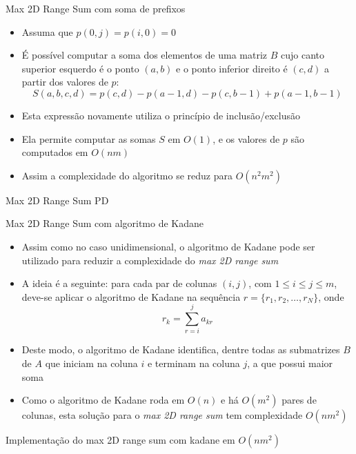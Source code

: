 \begin{frame}[fragile]{Max 2D Range Sum com soma de prefixos}

    \begin{itemize}
        \item Assuma que $p(0, j) = p(i, 0) = 0$

        \item É possível computar a soma dos elementos de uma matriz $B$ cujo canto superior
            esquerdo é o ponto $(a, b)$ e o ponto inferior direito é $(c, d)$ a partir dos
            valores de $p$:
        \[
            S(a, b, c, d) = p(c, d) - p(a - 1, d) - p(c, b - 1) + p(a - 1, b - 1)
        \]

        \item Esta expressão novamente utiliza o princípio de inclusão/exclusão

        \item Ela permite computar as somas $S$ em $O(1)$, e os valores de $p$ são computados em
            $O(nm)$

        \item Assim a complexidade do algoritmo se reduz para $O(n^2m^2)$

    \end{itemize}

\end{frame}



\begin{frame}[fragile]{Max 2D Range Sum PD}
\end{frame}

\begin{frame}[fragile]{Max 2D Range Sum com algoritmo de Kadane}

    \begin{itemize}
        \item Assim como no caso unidimensional, o algoritmo de Kadane pode ser utilizado para
            reduzir a complexidade do \textit{max 2D range sum}

        \item A ideia é a seguinte: para cada par de colunas $(i, j)$, com $1\leq i\leq j \leq m$,
            deve-se aplicar o algoritmo de Kadane na sequência $r = \{ r_1, r_2, \ldots, r_N \} $,
            onde
            \[
                r_k = \sum_{r = i}^j a_{kr}
            \]

        \item Deste modo, o algoritmo de Kadane identifica, dentre todas as submatrizes $B$ de $A$
            que iniciam na coluna $i$ e terminam na coluna $j$, a que possui maior soma

        \item Como o algoritmo de Kadane roda em $O(n)$ e há $O(m^2)$ pares de colunas, 
            esta solução para o \textit{max 2D range sum} tem complexidade $O(nm^2)$
    \end{itemize}

\end{frame}

\begin{frame}[fragile]{Implementação do max 2D range sum com kadane em $O(nm^2)$}
\end{frame}
